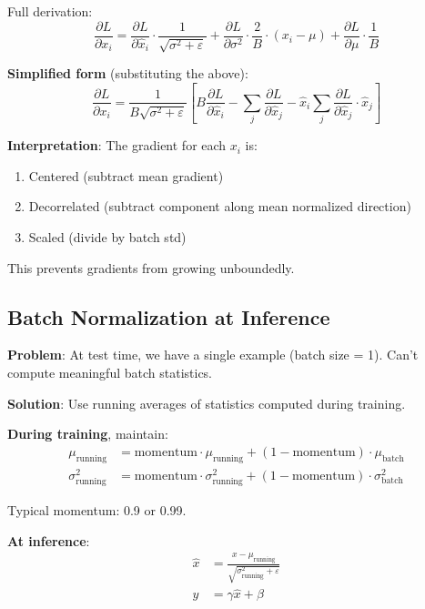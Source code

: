 Full derivation:
\[
\frac{\partial L}{\partial x_i} = \frac{\partial L}{\partial \hat{x}_i} \cdot \frac{1}{\sqrt{\sigma^2 + \varepsilon}} + \frac{\partial L}{\partial \sigma^2} \cdot \frac{2}{B} \cdot (x_i - \mu) + \frac{\partial L}{\partial \mu} \cdot \frac{1}{B}
\]

\textbf{Simplified form} (substituting the above):
\[
\frac{\partial L}{\partial x_i} = \frac{1}{B \sqrt{\sigma^2 + \varepsilon}} \left[B \frac{\partial L}{\partial \hat{x}_i} - \sum_j \frac{\partial L}{\partial \hat{x}_j} - \hat{x}_i \sum_j \frac{\partial L}{\partial \hat{x}_j} \cdot \hat{x}_j\right]
\]

\textbf{Interpretation}: The gradient for each $x_i$ is:
\begin{enumerate}
\item Centered (subtract mean gradient)
\item Decorrelated (subtract component along mean normalized direction)
\item Scaled (divide by batch std)
\end{enumerate}

This prevents gradients from growing unboundedly.

\subsection{Batch Normalization at Inference}

\textbf{Problem}: At test time, we have a single example (batch size = 1). Can't compute meaningful batch statistics.

\textbf{Solution}: Use running averages of statistics computed during training.

\textbf{During training}, maintain:
\begin{align*}
\mu_{\text{running}} &= \text{momentum} \cdot \mu_{\text{running}} + (1 - \text{momentum}) \cdot \mu_{\text{batch}} \\
\sigma^2_{\text{running}} &= \text{momentum} \cdot \sigma^2_{\text{running}} + (1 - \text{momentum}) \cdot \sigma^2_{\text{batch}}
\end{align*}

Typical momentum: 0.9 or 0.99.

\textbf{At inference}:
\begin{align*}
\hat{x} &= \frac{x - \mu_{\text{running}}}{\sqrt{\sigma^2_{\text{running}} + \varepsilon}} \\
y &= \gamma \hat{x} + \beta
\end{align*}

